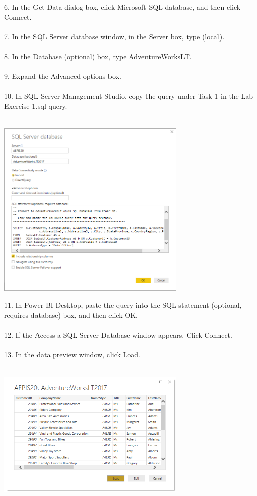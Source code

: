 \documentclass[12pt,letterpaper]{article}
\begin{document}
6. In the Get Data dialog box, click Microsoft SQL database, and then click Connect.\\\\
7. In the SQL Server database window, in the Server box, type (local).\\\\
8. In the Database (optional) box, type AdventureWorksLT.\\\\
9. Expand the Advanced options box.\\\\
10. In SQL Server Management Studio, copy the query under Task 1 in the Lab Exercise 1.sql query.\\\\
\begin{center}
\includegraphics[width=9cm]{IMG/32.png} 
\end{center}
11. In Power BI Desktop, paste the query into the SQL statement (optional, requires database) box, and then click OK.\\\\
12. If the Access a SQL Server Database window appears. Click Connect.\\\\
13. In the data preview window, click Load.\\\\
\begin{center}
\includegraphics[width=9cm]{IMG/33.png} 
\end{center}
\end{document}

